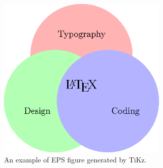 \documentclass{article}
\begin{document}
\begin{figure}
\centering 
\includegraphics[width=3.2in]{tikz2eps-figure0.eps}
\caption{An example of EPS figure generated by TiKz.}
\end{figure}
\end{document}
